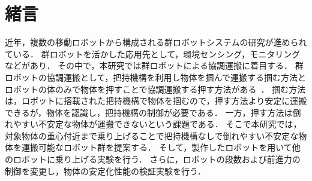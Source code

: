 \section{緒言}
近年，複数の移動ロボットから構成される群ロボットシステムの研究が進められている．
群ロボットを活かした応用先として，環境センシング，モニタリングなどがあり．
その中で，本研究では群ロボットによる協調運搬に着目する．
群ロボットの協調運搬として，把持機構を利用し物体を掴んで運搬する掴む方法とロボットの体のみで物体を押すことで協調運搬する押す方法がある~\cite{swarmBot,argos}．
掴む方法は，ロボットに搭載された把持機構で物体を掴むので，押す方法より安定に運搬できるが，物体を認識し，把持機構の制御が必要である．
一方，押す方法は倒れやすい不安定な物体が運搬できないという課題である．
そこで本研究では，対象物体の重心付近まで乗り上げることで把持機構なしで倒れやすい不安定な物体を運搬可能なロボット群を提案する．
そして，製作したロボットを用いて他のロボットに乗り上げる実験を行う．
さらに，ロボットの段数および前進力の制御を変更し，物体の安定化性能の検証実験を行う．
